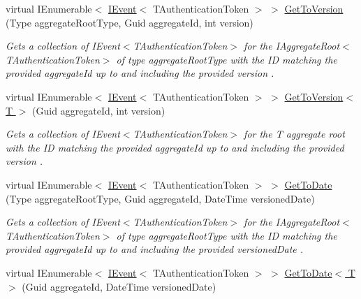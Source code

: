 \begin{DoxyCompactItemize}
virtual I\+Enumerable$<$ \hyperlink{interfaceCqrs_1_1Events_1_1IEvent}{I\+Event}$<$ T\+Authentication\+Token $>$ $>$ \hyperlink{classCqrs_1_1Events_1_1InProcessEventStore_a88c16e2e7051094a5444a566f69119e7_a88c16e2e7051094a5444a566f69119e7}{Get\+To\+Version} (Type aggregate\+Root\+Type, Guid aggregate\+Id, int version)
\begin{DoxyCompactList}\small\item\em Gets a collection of I\+Event$<$\+T\+Authentication\+Token$>$ for the I\+Aggregate\+Root$<$\+T\+Authentication\+Token$>$ of type {\itshape aggregate\+Root\+Type}  with the ID matching the provided {\itshape aggregate\+Id}  up to and including the provided {\itshape version} . \end{DoxyCompactList}\item 
virtual I\+Enumerable$<$ \hyperlink{interfaceCqrs_1_1Events_1_1IEvent}{I\+Event}$<$ T\+Authentication\+Token $>$ $>$ \hyperlink{classCqrs_1_1Events_1_1InProcessEventStore_ac9fe9abecc4c2537bc5d62df6132dc30_ac9fe9abecc4c2537bc5d62df6132dc30}{Get\+To\+Version$<$ T $>$} (Guid aggregate\+Id, int version)
\begin{DoxyCompactList}\small\item\em Gets a collection of I\+Event$<$\+T\+Authentication\+Token$>$ for the {\itshape T} aggregate root with the ID matching the provided {\itshape aggregate\+Id}  up to and including the provided {\itshape version} . \end{DoxyCompactList}\item 
virtual I\+Enumerable$<$ \hyperlink{interfaceCqrs_1_1Events_1_1IEvent}{I\+Event}$<$ T\+Authentication\+Token $>$ $>$ \hyperlink{classCqrs_1_1Events_1_1InProcessEventStore_ab2e2cf9240ab703b81e932194b722749_ab2e2cf9240ab703b81e932194b722749}{Get\+To\+Date} (Type aggregate\+Root\+Type, Guid aggregate\+Id, Date\+Time versioned\+Date)
\begin{DoxyCompactList}\small\item\em Gets a collection of I\+Event$<$\+T\+Authentication\+Token$>$ for the I\+Aggregate\+Root$<$\+T\+Authentication\+Token$>$ of type {\itshape aggregate\+Root\+Type}  with the ID matching the provided {\itshape aggregate\+Id}  up to and including the provided {\itshape versioned\+Date} . \end{DoxyCompactList}\item 
virtual I\+Enumerable$<$ \hyperlink{interfaceCqrs_1_1Events_1_1IEvent}{I\+Event}$<$ T\+Authentication\+Token $>$ $>$ \hyperlink{classCqrs_1_1Events_1_1InProcessEventStore_a2ff4e2e27cb25be2e579fde08e1c0048_a2ff4e2e27cb25be2e579fde08e1c0048}{Get\+To\+Date$<$ T $>$} (Guid aggregate\+Id, Date\+Time versioned\+Date)

\end{DoxyCompactItemize}
